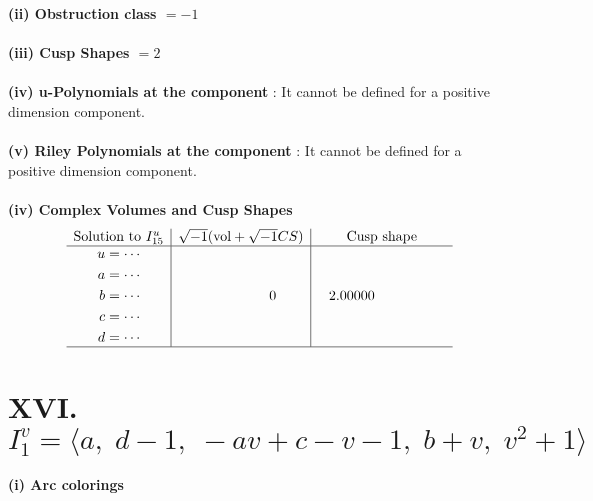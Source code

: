 \documentclass[1p]{elsarticle_modified}
\theoremstyle{definition}
\newcommand{\I}{\sqrt{-1}}
\begin{document}
\flushleft \textbf{(ii) Obstruction class $= -1$}\\~\\
\flushleft \textbf{(iii) Cusp Shapes $= 2$}\\~\\
\flushleft \textbf{(iv) u-Polynomials at the component} : It cannot be defined for a positive dimension component.\\~\\
\flushleft \textbf{(v) Riley Polynomials at the component} : It cannot be defined for a positive dimension component.\\~\\
\newpage\flushleft \textbf{(iv) Complex Volumes and Cusp Shapes}
$$\begin{array}{c|c|c} 
\text{Solution to }I^u_{15}& \I (\text{vol} + \sqrt{-1}CS) & \text{Cusp shape}\\
 \hline 
\begin{aligned}
u &= \cdots \\
a &= \cdots \\
b &= \cdots \\
c &= \cdots \\
d &= \cdots\end{aligned}
 & \phantom{-0.000000 } 0 & \phantom{-}2.00000\phantom{ +0.000000I}\\
 \hline 
 \end{array}
$$\newpage\renewcommand{\arraystretch}{1}
\centering \section*{XVI. $I^v_{1}= \langle a,\;d-1,\;- a v+c- v-1,\;b+v,\;v^2+1 \rangle$}
\flushleft \textbf{(i) Arc colorings}\\
\end{document}
